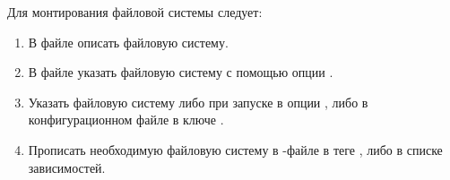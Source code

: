 Для монтирования файловой системы следует:
\begin{enumerate}
	\item В файле  описать файловую систему.
	\item В файле  указать файловую систему с помощью опции .
	\item Указать файловую систему либо при запуске  в опции , либо в конфигурационном файле  в ключе .
	\item Прописать необходимую файловую систему в -файле в теге , либо в списке зависимостей.
\end{enumerate} 